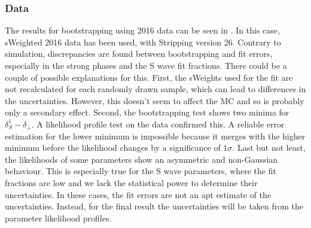 \subsubsection{Data}
The results for bootstrapping using 2016 data can be seen in . In this case, sWeighted 2016 data has been used, with Stripping version 26.  Contrary to simulation, discrepancies are found between bootstrapping and fit errors, especially in the strong phases and the S wave fit fractions. There could be a couple of
possible explanations for this. First, the sWeights used for the fit are not recalculated for each randomly drawn sample, which can lead to differences in the uncertainties.
However, this doesn't seem to affect the MC and so is probably only a secondary effect. Second, the bootstrapping test shows two minima for $\delta_S^1 - \delta_\perp$. A likelihood profile test on the data confirmed this. A reliable error estimation for the lower minimum is impossible because it merges with the higher minimum before the likelihood  changes by a significance of $1\sigma$. Last but not least, the likelihoods of some parameters show an asymmetric and non-Gaussian behaviour. This is especially true for the S wave parameters, where the fit fractions are low and we lack the statistical power to determine their uncertainties. In these cases, the fit errors are not an apt estimate of the  uncertainties. Instead, for the final result the uncertainties will be taken from the parameter likelihood profiles.

